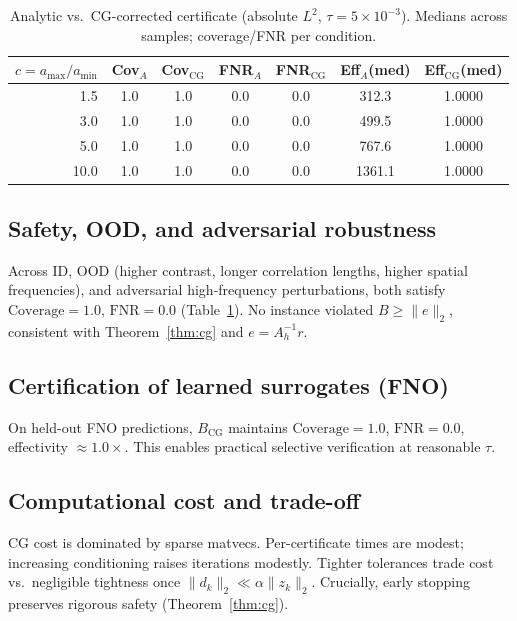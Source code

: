 \documentclass[conference]{IEEEtran}
\theoremstyle{plain}
\theoremstyle{definition}
\begin{document}
\begin{table}[t]
\centering
\caption{Analytic vs.\ CG-corrected certificate (absolute $L^2$, $\tau=5\times 10^{-3}$). Medians across samples; coverage/FNR per condition.}
\label{tab:main}
\begin{tabular}{rcccccc}
\toprule
$c=a_{\max}/a_{\min}$ & Cov$_A$ & Cov$_{\mathrm{CG}}$ & FNR$_A$ & FNR$_{\mathrm{CG}}$ & Eff$_A$(med) & Eff$_{\mathrm{CG}}$(med)\\
\midrule
1.5 & 1.0 & 1.0 & 0.0 & 0.0 & 312.3 & 1.0000\\
3.0 & 1.0 & 1.0 & 0.0 & 0.0 & 499.5 & 1.0000\\
5.0 & 1.0 & 1.0 & 0.0 & 0.0 & 767.6 & 1.0000\\
10.0 & 1.0 & 1.0 & 0.0 & 0.0 & 1361.1 & 1.0000\\
\bottomrule
\end{tabular}
\end{table}

\subsection{Safety, OOD, and adversarial robustness}
Across ID, OOD (higher contrast, longer correlation lengths, higher spatial frequencies), and adversarial high-frequency perturbations, both satisfy $\text{Coverage}=1.0$, $\text{FNR}=0.0$ (Table~\ref{tab:main}). No instance violated $B \ge \|e\|_2$, consistent with Theorem~\ref{thm:cg} and $e=A_h^{-1}r$.

\subsection{Certification of learned surrogates (FNO)}
On held-out FNO predictions, $B_{\mathrm{CG}}$ maintains $\text{Coverage}=1.0$, $\text{FNR}=0.0$, effectivity $\approx 1.0\times$. This enables practical selective verification at reasonable $\tau$.

\subsection{Computational cost and trade-off}
CG cost is dominated by sparse matvecs. Per-certificate times are modest; increasing conditioning raises iterations modestly. Tighter tolerances trade cost vs.\ negligible tightness once $\|d_k\|_2 \ll \alpha\|z_k\|_2$. Crucially, early stopping preserves rigorous safety (Theorem~\ref{thm:cg}).
\end{document}

